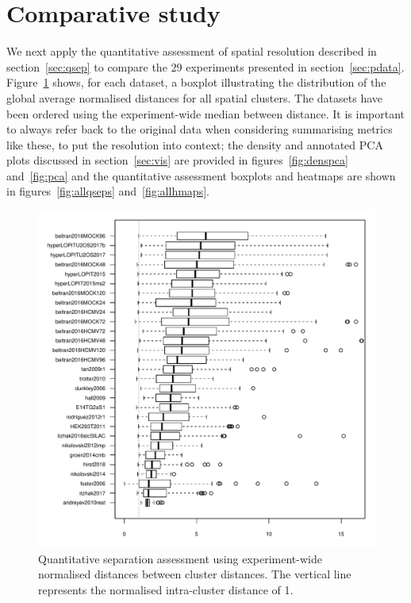 \documentclass[12pt]{article}\usepackage[]{graphicx}\usepackage[]{color}
\newenvironment{knitrout}{}{} %
\begin{document}
\clearpage

\section{Comparative study}\label{sec:compara}

We next apply the quantitative assessment of spatial resolution
described in section~\ref{sec:qsep} to compare the 29
experiments presented in
section~\ref{sec:pdata}. Figure~\ref{fig:qsep} shows, for each
dataset, a boxplot illustrating the distribution of the global average
normalised distances for all spatial clusters. The datasets have been
ordered using the experiment-wide median between distance. It is
important to always refer back to the original data when considering
summarising metrics like these, to put the resolution into context;
the density and annotated PCA plots discussed in section~\ref{sec:vis}
are provided in figures~\ref{fig:denspca} and~\ref{fig:pca} and the
quantitative assessment boxplots and heatmaps are shown in
figures~\ref{fig:allqseps} and~\ref{fig:allhmaps}.



\begin{figure}[ht]
  \centering
\begin{knitrout}
\color{fgcolor}
\includegraphics[width=0.65\linewidth]{figure/figqsep-1} 

\end{knitrout}
\caption{Quantitative separation assessment using experiment-wide
  normalised distances between cluster distances. The vertical line
  represents the normalised intra-cluster distance of 1.}
  \label{fig:qsep}
\end{figure}
\end{document}
